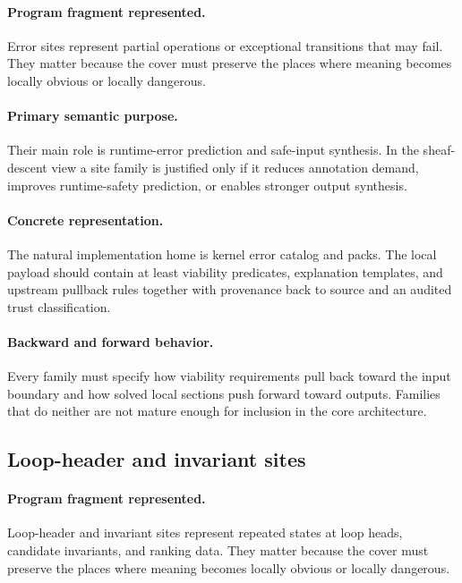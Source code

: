 \documentclass[11pt]{report}
\theoremstyle{definition}
\theoremstyle{plain}
\begin{document}
\paragraph{Program fragment represented.}
Error sites represent partial operations or exceptional transitions that may fail. They matter because the cover must preserve the
places where meaning becomes locally obvious or locally dangerous.

\paragraph{Primary semantic purpose.}
Their main role is runtime-error prediction and safe-input synthesis. In the sheaf-descent view a site family is
justified only if it reduces annotation demand, improves runtime-safety
prediction, or enables stronger output synthesis.

\paragraph{Concrete representation.}
The natural implementation home is kernel error catalog and packs. The local payload should contain
at least viability predicates, explanation templates, and upstream pullback rules together with provenance back to source and an audited
trust classification.

\paragraph{Backward and forward behavior.}
Every family must specify how viability requirements pull back toward the
input boundary and how solved local sections push forward toward outputs.
Families that do neither are not mature enough for inclusion in the core
architecture.

\subsection{Loop-header and invariant sites}

\paragraph{Program fragment represented.}
Loop-header and invariant sites represent repeated states at loop heads, candidate invariants, and ranking data. They matter because the cover must preserve the
places where meaning becomes locally obvious or locally dangerous.
\end{document}
